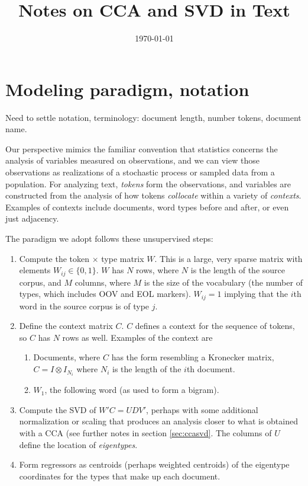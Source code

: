 \documentclass[12pt]{article}
\title{ Notes on CCA and SVD in Text }
\date{\today}
\begin{document}



\section{Modeling paradigm, notation}
\label{sec:paradigm}

Need to settle notation, terminology: document length, number tokens, document
name.


Our perspective mimics the familiar convention that statistics concerns the
analysis of variables measured on observations, and we can view those
observations as realizations of a stochastic process or sampled data from a
population.  For analyzing text, {\em tokens} form the observations, and
variables are constructed from the analysis of how tokens {\em collocate} within
a variety of {\em contexts}.  Examples of contexts include documents, word types
before and after, or even just adjacency.

The paradigm we adopt follows these unsupervised steps:
\begin{enumerate}
 \item
 Compute the token $\times$ type matrix $W$.  This is a large, very sparse matrix with
 elements $W_{ij} \in \{0,1\}$.  $W$ has $N$ rows, where $N$ is the length of
 the source corpus, and $M$ columns, where $M$ is the size of the vocabulary
 (the number of types, which includes OOV and EOL markers). $W_{ij}=1$ implying
 that the $i$th word in the source corpus is of type $j$.
 \item
 Define the context matrix $C$.  $C$ defines a context for the sequence of
 tokens, so $C$ has $N$ rows as well.  Examples of the context are
  \begin{enumerate}
    \item Documents, where $C$ has the form resembling a Kronecker matrix,
                $C = I \otimes I_{N_i}$ 
          where $N_i$ is the length of the $i$th document.
    \item $W_1$, the following word (as used to form a bigram).
  \end{enumerate}
 \item
 Compute the SVD of $W'C = UDV'$, perhaps with some additional normalization or
 scaling that produces an analysis closer to what is obtained with a CCA (see
 further notes in section \ref{sec:ccasvd}.  The columns of $U$ define the
 location of {\em eigentypes}.
 \item
 Form regressors as centroids (perhaps weighted centroids) of the eigentype
 coordinates for the types that make up each document.
\end{enumerate}
\end{document}
